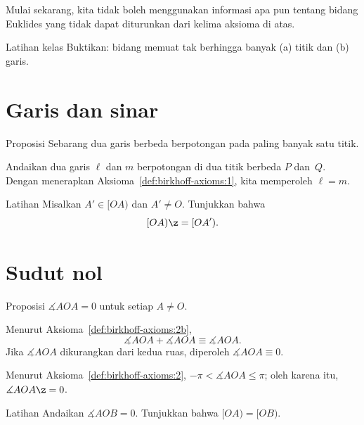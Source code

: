 Mulai sekarang,  
kita tidak boleh menggunakan informasi apa pun tentang bidang Euklides yang tidak dapat diturunkan dari kelima aksioma di atas.

\begin{thm}{Latihan kelas}\label{ex:infinite}
Buktikan: bidang memuat tak berhingga banyak (a) titik dan (b) garis.
\end{thm}

\section{Garis dan sinar}

\begin{thm}[\abs]{Proposisi}\label{lem:line-line}
\let\thefootnote\relax{}
Sebarang dua garis berbeda berpotongan pada paling banyak satu titik.
\end{thm}

Andaikan dua garis $\ell$ dan $m$ berpotongan di dua titik berbeda $P$ dan~$Q$.
Dengan menerapkan Aksioma~\ref{def:birkhoff-axioms:1}, kita memperoleh $\ell=m$.
\qeds

\begin{thm}{Latihan}\label{ex:[OA)=[OA')}
Misalkan $A'\in[OA)$ dan $A'\not=O$. 
Tunjukkan bahwa 
\[[O A)\z=[O A').\]

\end{thm}

\section{Sudut nol}

\begin{thm}[\abs]{Proposisi}\label{lem:AOA=0}
$\measuredangle A O A= 0$ untuk setiap $A\not=O$.
\end{thm}

Menurut Aksioma~\ref{def:birkhoff-axioms:2b},
$$\measuredangle A O A
+
\measuredangle A O A 
\equiv
\measuredangle A O A.$$
Jika $\measuredangle A O A$ dikurangkan dari kedua ruas, diperoleh
$\measuredangle A O A \equiv 0$.

Menurut Aksioma~\ref{def:birkhoff-axioms:2}, $-\pi<\measuredangle A O A\le \pi$;
oleh karena itu, $\measuredangle A O A \z= 0$.
\qeds

\begin{thm}[!]{Latihan}\label{ex:[OA)=[OB)}
Andaikan $\measuredangle A O B= 0$.
Tunjukkan bahwa $[OA)=[OB)$.
\end{thm}

